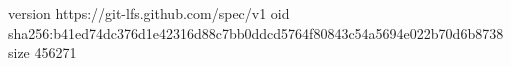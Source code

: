 version https://git-lfs.github.com/spec/v1
oid sha256:b41ed74dc376d1e42316d88c7bb0ddcd5764f80843c54a5694e022b70d6b8738
size 456271
